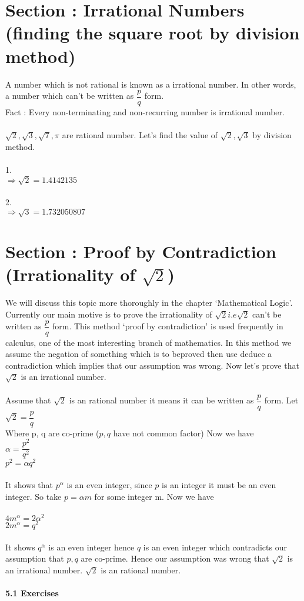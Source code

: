 \documentclass[a4paper,10pt]{article}
\begin{document}
\section{Section : Irrational Numbers (finding the square root by
division method)}
A number which is not rational is known as a irrational number. In other
words, a number which can’t be written as $\dfrac{p}{q}$ form.\\
Fact : Every non-terminating and non-recurring number is irrational
number.\\\\
$\sqrt{2},\sqrt{3},\sqrt{7},\pi$ are rational number.
Let’s find the value of $\sqrt{2},\sqrt{3}$ by division method.\\\\
1.\\
$\Rightarrow \sqrt{2} = 1.4142135$\\\\
2.\\
$\Rightarrow \sqrt{3} = 1.732050807$
\section{Section :
Proof by Contradiction (Irrationality of $\sqrt{2}$)}
We will discuss this topic more thoroughly in the chapter ‘Mathematical
Logic’. Currently
our main motive is to prove the irrationality of $\sqrt{2} i.e \sqrt{2}$
can’t be written as $\dfrac{p}{q}$ form. This
method ‘proof by contradiction’ is used frequently in calculus, one of
the most interesting
branch of mathematics. In this method we assume the negation of
something which is to beproved then use deduce a contradiction which
implies that our assumption was wrong. Now let’s prove that $\sqrt{2}$ is an
irrational number.\\\\
Assume that $\sqrt{2}$ is an rational number it means it can be written
as $\dfrac{p}{q}$
form. Let\\
$\sqrt{2} = \dfrac{p}{q}$\\
Where p, q are co-prime ($p, q$ have not common factor) Now we have\\
$\alpha = \dfrac{p^2}{q^2}$\\
$p^2 = \alpha q^2$\\\\
It shows that $p^\alpha$ is an even integer, since $p$ is an integer it must be
an even integer. So take $p = \alpha m$ for some integer m. Now we
have\\\\
$4 m^\alpha = 2 \alpha^2$\\
$2 m^\alpha = q^2$\\\\
It shows $q^\alpha$ is an even integer hence $q$ is an even integer which
contradicts our assumption
that $p, q$ are co-prime. Hence our assumption was wrong that
$\sqrt{2}$ is an irrational number.
$\sqrt{2}$ is an rational number.\\\\ 
\large{\textbf{5.1 Exercises}}
\end{document}
